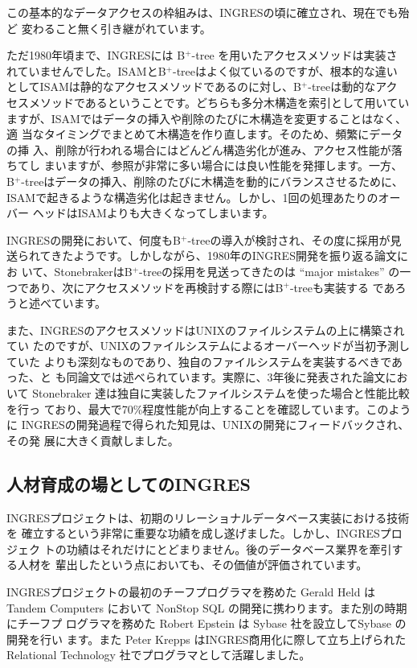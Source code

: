 この基本的なデータアクセスの枠組みは、INGRESの頃に確立され、現在でも殆ど
変わること無く引き継がれています。


ただ1980年頃まで、INGRESには B$^+$-tree を用いたアクセスメソッドは実装さ
れていませんでした。ISAMとB$^+$-treeはよく似ているのですが、根本的な違い
としてISAMは静的なアクセスメソッドであるのに対し、B$^+$-treeは動的なアク
セスメソッドであるということです。どちらも多分木構造を索引として用いてい
ますが、ISAMではデータの挿入や削除のたびに木構造を変更することはなく、適
当なタイミングでまとめて木構造を作り直します。そのため、頻繁にデータの挿
入、削除が行われる場合にはどんどん構造劣化が進み、アクセス性能が落ちてし
まいますが、参照が非常に多い場合には良い性能を発揮します。一方、
B$^+$-treeはデータの挿入、削除のたびに木構造を動的にバランスさせるために、
ISAMで起きるような構造劣化は起きません。しかし、1回の処理あたりのオーバー
ヘッドはISAMよりも大きくなってしまいます。


INGRESの開発において、何度もB$^+$-treeの導入が検討され、その度に採用が見
送られてきたようです。しかしながら、1980年のINGRES開発を振り返る論文にお
いて、StonebrakerはB$^+$-treeの採用を見送ってきたのは ``major mistakes''
の一つであり、次にアクセスメソッドを再検討する際にはB$^+$-treeも実装する
であろうと述べています。


また、INGRESのアクセスメソッドはUNIXのファイルシステムの上に構築されてい
たのですが、UNIXのファイルシステムによるオーバーヘッドが当初予測していた
よりも深刻なものであり、独自のファイルシステムを実装するべきであった、と
も同論文では述べられています。実際に、3年後に発表された論文において
Stonebraker 達は独自に実装したファイルシステムを使った場合と性能比較を行っ
ており、最大で70\%程度性能が向上することを確認しています。このように
INGRESの開発過程で得られた知見は、UNIXの開発にフィードバックされ、その発
展に大きく貢献しました。


\subsection{人材育成の場としてのINGRES}


INGRESプロジェクトは、初期のリレーショナルデータベース実装における技術を
確立するという非常に重要な功績を成し遂げました。しかし、INGRESプロジェク
トの功績はそれだけにとどまりません。後のデータベース業界を牽引する人材を
輩出したという点においても、その価値が評価されています。


INGRESプロジェクトの最初のチーフプログラマを務めた Gerald Held はTandem
Computers において NonStop SQL の開発に携わります。また別の時期にチーフプ
ログラマを務めた Robert Epstein は Sybase 社を設立してSybase の開発を行い
ます。また Peter Krepps はINGRES商用化に際して立ち上げられた Relational
Technology 社でプログラマとして活躍しました。


